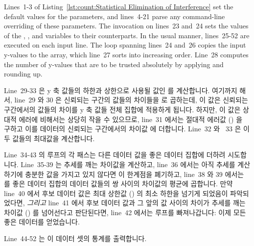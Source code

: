Lines~1-3 of
Listing~\ref{lst:count:Statistical Elimination of Interference}
set the default values for the parameters, and lines~4-21 parse
any command-line overriding of these parameters.
The  invocation on lines~23 and~24 sets the values of the
, , and  variables to their
 counterparts.
In the usual  manner, lines~25-52 are executed on each input
line.
The loop spanning lines~24 and~26 copies the input y-values to the
 array, which line~27 sorts into increasing order.
Line~28 computes the number of y-values that are to be trusted absolutely
by applying  and rounding up.
\fi

Line~29-33 은 y 축 값들의 하한과 상한으로 사용될 값인  를
계산합니다.
여기까지 해서, line~29 와 30 은 신뢰되는 구간의 값들의 차이들을  로
곱하는데, 이 값은 신뢰되는 구간에서의 값들의 차이를 y 축 값들 전체 집합에
적용하게 됩니다.
하지만, 이 값은 상대적 에러에 비해서는 상당히 작을 수 있으므로, line~31 에서는
절대적 에러값 () 을 구하고 이를 데이터의 신뢰되는 구간에서의
차이값  에 더합니다.
Line~32 와 ~33 은 이 두 값들의 최대값을 계산합니다.

Line~34-43 의 루프의 각 패스는 다른 데이터 값을 좋은 데이터 집합에 더하려
시도합니다.
Line~35-39 는 추세를 깨는 차이값을 계산하고, line~36 에서는 아직 추세를
계산하기에 충분한 값을 가지고 있지 않다면 이 한계점을 폐기하고, line~38 와 39
에서는  를 좋은 데이터 집합의 데이터 값들의 쌍 사이의 차이값의
평균에 곱합니다.
만약 line~40 에서 후보 데이터 값은 최대 상한값 () 의 최소 하한을
넘기게 되었음이 파악되었다면, \emph{그리고} line~41 에서 후보 데이터 값과 그
앞의 값 사이의 차이가 추세를 깨는 차이값 () 를 넘어선다고
판단된다면, line~42 에서는 루프를 빠져나갑니다: 이제 모든 좋은 데이터를
얻었습니다.

Line~44-52 는 이 데이터 셋의 통계를 출력합니다.
\iffalse

